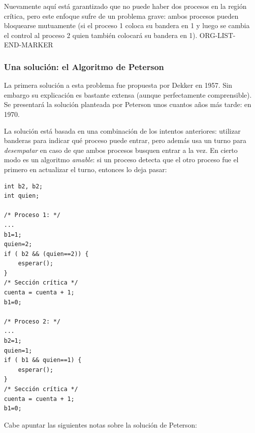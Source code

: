 \documentclass[11pt,fleqn]{book} %
\begin{document}
  Nuevamente aquí está garantizado que no puede haber dos procesos en la
  región crítica, pero este enfoque sufre de un problema grave: ambos
  procesos pueden bloquearse mutuamente (si el proceso 1 coloca su
  bandera en 1 y luego se cambia el control al proceso 2 quien también
  colocará su bandera en 1).
ORG-LIST-END-MARKER
\subsubsection{Una solución: el Algoritmo de Peterson}
\label{sec-3-3-2-4}


La primera solución a esta problema fue propuesta por Dekker
en 1957. Sin embargo su explicación es bastante extensa (aunque
perfectamente comprensible). Se presentará la solución
planteada por Peterson unos cuantos años más tarde: en 1970.

La solución está basada en una combinación de los intentos anteriores:
utilizar banderas para indicar qué proceso puede entrar, pero además
usa un turno para \emph{desempatar} en caso de que ambos procesos busquen
entrar a la vez. En cierto modo es un algoritmo \emph{amable}: si un proceso
detecta que el otro proceso fue el primero en actualizar el turno,
entonces lo deja pasar:


\begin{verbatim}
int b2, b2;
int quien;

/* Proceso 1: */
...
b1=1;
quien=2;
if ( b2 && (quien==2)) {
    esperar();
}
/* Sección crítica */
cuenta = cuenta + 1;
b1=0;

/* Proceso 2: */
...
b2=1;
quien=1;
if ( b1 && quien==1) {
    esperar();
}
/* Sección crítica */
cuenta = cuenta + 1;
b1=0;
\end{verbatim}

Cabe apuntar las siguientes notas sobre la solución de Peterson:
\end{document}
